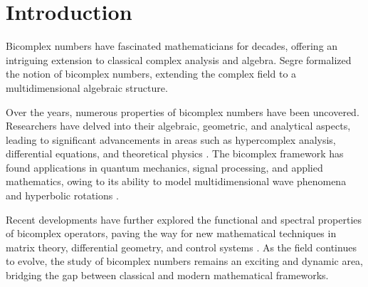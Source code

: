 \documentclass[a4paper,12pt]{article}
\theoremstyle{remark}
\begin{document}
	
\section{Introduction}

Bicomplex numbers have fascinated mathematicians for decades, offering an intriguing extension to classical complex analysis and algebra. %
Segre \cite{csegre1892} formalized the notion of bicomplex numbers, extending the complex field to a multidimensional algebraic structure.

\noindent Over the years, numerous properties of bicomplex numbers have been uncovered. Researchers have delved into their algebraic, geometric, and analytical aspects, leading to significant advancements in areas such as hypercomplex analysis, differential equations, and theoretical physics \cite{catoni2008mathematics, price1991explicit, roch2014functional}. The bicomplex framework has found applications in quantum mechanics, signal processing, and applied mathematics, owing to its ability to model multidimensional wave phenomena and hyperbolic rotations \cite{ghimici2017differential, riley2001applications}.

\noindent Recent developments have further explored the functional and spectral properties of bicomplex operators, paving the way for new mathematical techniques in matrix theory, differential geometry, and control systems \cite{roch2014functional, mitelman1997bicompact, beltita2015cayley}. As the field continues to evolve, the study of bicomplex numbers remains an exciting and dynamic area, bridging the gap between classical and modern mathematical frameworks.



\end{document}

